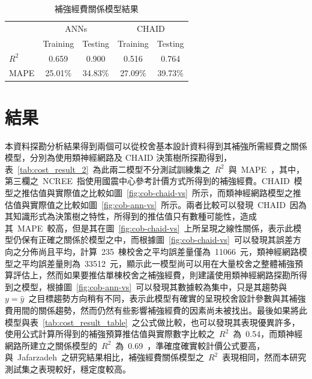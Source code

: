 

{\renewcommand{\arraystretch}{1.5}
\begin{table}[hbtp]
  \begin{center}
    \caption{補強經費關係模型結果}
    \label{tab:cost_result}
    \large
    \begin{tabular}{l c c c c}
      \hline
       & \multicolumn{2}{c}{ANNs} & \multicolumn{2}{c}{CHAID} \\
       & Training & Testing & Training & Testing \\
      \hline
      $R^2$ & 0.659 & 0.900 & 0.516 & 0.764 \\
      MAPE & 25.01\% &34.83\% & 27.09\% & 39.73\% \\
      \hline
      \end{tabular}
  \end{center}
\end{table}
}

\section{結果}

本資料探勘分析結果得到兩個可以從校舍基本設計資料得到其補強所需經費之關係模型，分別為使用類神經網路及 CHAID 決策樹所探勘得到，表~\ref{tab:cost_result_2}~為此兩二模型不分測試訓練集之~$R^2$~與~MAPE~，其中，第三欄之~NCREE~指使用國震中心參考計價方式所得到的補強經費。CHAID~模型之推估值與實際值之比較如圖~\ref{fig:cob-chaid-vs}~所示，而類神經網路模型之推估值與實際值之比較如圖~\ref{fig:cob-ann-vs}~所示。兩者比較可以發現~CHAID~因為其知識形式為決策樹之特性，所得到的推估值只有數種可能性，造成其~MAPE~較高，但是其在圖~\ref{fig:cob-chaid-vs}~上所呈現之線性關係，表示此模型仍保有正確之關係於模型之中，而根據圖~\ref{fig:cob-chaid-vs}~可以發現其誤差方向之分佈尚且平均，計算~235~棟校舍之平均誤差量僅為~11066~元，類神經網路模型之平均誤差量則為~33512~元，顯示此一模型尚可以用在大量校舍之整體補強預算評估上，然而如果要推估單棟校舍之補強經費，則建議使用類神經網路探勘所得到之模型，根據圖~\ref{fig:cob-ann-vs}~可以發現其數據較為集中，只是其趨勢與~$y = \hat{y}$~之目標趨勢方向稍有不同，表示此模型有確實的呈現校舍設計參數與其補強費用間的關係趨勢，然而仍然有些影響補強經費的因素尚未被找出。最後如果將此模型與表~\ref{tab:cost_result_table}~之公式做比較，也可以發現其表現優異許多，使用公式計算所得到的補強預算推估值與實際數字比較之~$R^2$~為~0.54，而類神經網路所建立之關係模型的~$R^2$~為~0.69~，準確度確實較計價公式要高，與~Jafarzadeh\cite{jafarzadeh2013predicting}\cite{jafarzadeh2013application}~之研究結果相比，補強經費關係模型之~$R^2$~表現相同，然而本研究測試集之表現較好，穩定度較高。

